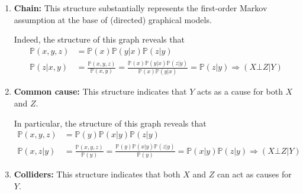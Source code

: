 \documentclass{report}
\begin{document}
\begin{enumerate}
    \item \textbf{Chain: }This structure substantially represents the first-order Markov assumption at the base of (directed) graphical models.
    

    \noindent Indeed, the structure of this graph reveals that
    \begin{align*}
        \mathbb{P}(x, y, z) &= \mathbb{P}(x)\mathbb{P}(y|x)\mathbb{P}(z|y) \\
        \mathbb{P}(z|x, y) &= \frac{\mathbb{P}(x, y, z)}{\mathbb{P}(x, y)} = \frac{\mathbb{P}(x)\mathbb{P}(y|x)\mathbb{P}(z|y)}{\mathbb{P}(x)\mathbb{P}(y|x)} = \mathbb{P}(z|y) \Rightarrow (X \bot Z|Y)
    \end{align*}
    \item \textbf{Common cause: }This structure indicates that $\displaystyle Y$ acts as a cause for both $\displaystyle X$ and $\displaystyle Z$.
    

    \noindent In particular, the structure of this graph reveals that
    \begin{align*}
        \mathbb{P}(x, y, z) &= \mathbb{P}(y)\mathbb{P}(x|y)\mathbb{P}(z|y) \\
        \mathbb{P}(x, z|y) &= \frac{\mathbb{P}(x, y, z)}{\mathbb{P}(y)} = \frac{\mathbb{P}(y)\mathbb{P}(x|y)\mathbb{P}(z|y)}{\mathbb{P}(y)} = \mathbb{P}(x|y)\mathbb{P}(z|y) \Rightarrow (X \bot Z|Y)
    \end{align*}
    \item \textbf{Colliders: }This structure indicates that both $\displaystyle X$ and $\displaystyle Z$ can act as causes for $\displaystyle Y$.


\end{enumerate}
\end{document}
